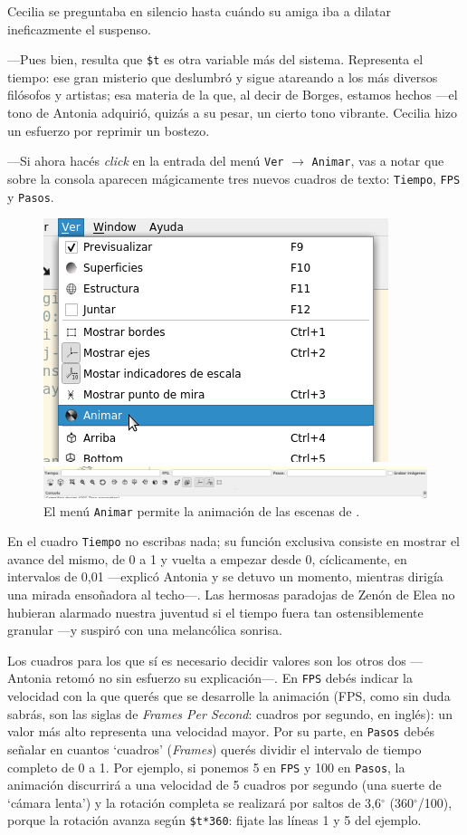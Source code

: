 Cecilia se preguntaba en silencio hasta cuándo su amiga iba a dilatar
ineficazmente el suspenso.

---Pues bien, resulta que \texttt{\$t} es otra variable más del
sistema.  Representa el tiempo: ese gran misterio que deslumbró y
sigue atareando a los más diversos filósofos y artistas; esa materia
de la que, al decir de Borges, estamos hechos ---el tono de Antonia
adquirió, quizás a su pesar, un cierto tono vibrante. Cecilia hizo un
esfuerzo por reprimir un bostezo.

---Si ahora hacés \emph{click} en la entrada del menú \texttt{Ver}
$\rightarrow$ \texttt{Animar}, vas a notar que sobre la consola
aparecen mágicamente tres nuevos cuadros de texto: \texttt{Tiempo},
\texttt{FPS} y \texttt{Pasos}.

\begin{figure}[ht]
  \centering
  \includegraphics[width=.5\textwidth]{imagenes/animar-menu}
  
  \vspace{1ex}
  \includegraphics[width=1\textwidth]{imagenes/animar-cuadros}
  \caption{El menú \texttt{Animar} permite la animación de las escenas
    de \openscad.}
  \label{fig:menu-animar}
\end{figure}
  

\guillemotright En el cuadro \texttt{Tiempo} no escribas nada; su
función exclusiva consiste en mostrar el avance del mismo, de 0 a 1 y
vuelta a empezar desde 0, cíclicamente, en intervalos de 0,01
---explicó Antonia y se detuvo un momento, mientras dirigía una mirada
ensoñadora al techo---. Las hermosas paradojas de Zenón de Elea no
hubieran alarmado nuestra juventud si el tiempo fuera tan
ostensiblemente granular ---y suspiró con una melancólica sonrisa.

\guillemotright Los cuadros para los que sí es necesario decidir
valores son los otros dos ---Antonia retomó no sin esfuerzo su
explicación---. En \texttt{FPS} debés indicar la velocidad con la que
querés que se desarrolle la animación (FPS, como sin duda sabrás, son
las siglas de \emph{Frames Per Second}: cuadros por segundo, en
inglés): un valor más alto representa una velocidad mayor. Por su
parte, en \texttt{Pasos} debés señalar en cuantos `cuadros'
(\emph{Frames}) querés dividir el intervalo de tiempo completo de 0 a
1. Por ejemplo, si ponemos 5 en \texttt{FPS} y 100 en \texttt{Pasos},
la animación discurrirá a una velocidad de 5 cuadros por segundo (una
suerte de `cámara lenta') y la rotación completa se realizará por
saltos de 3,6$^{\circ}$ (360$^{\circ}$/100), porque la rotación avanza según
\texttt{\$t*360}: fijate las líneas 1 y 5 del ejemplo.

